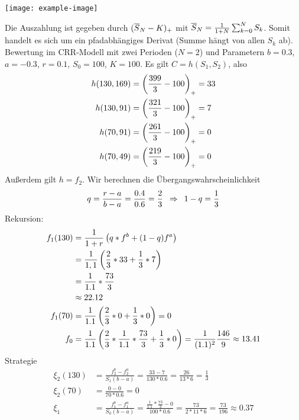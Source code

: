 \begin{*beispiel}
	\begin{center}
		\texttt{[image: example-image]}
	\end{center}

	Die Auszahlung ist gegeben durch $(\overline{S}_N - K)_+$ mit $\overline{S}_N = \frac{1}{1+N} \sum_{k=0}^{N} S_k$. Somit handelt es sich um ein pfadabhängiges Derivat (Summe hängt von allen $S_k$ ab). 
	Bewertung im CRR-Modell mit zwei Perioden ($N=2$) und Parametern $b = 0.3$, $a = -0.3$, $r=0.1$, $S_0 = 100$, $K=100$.
		Es gilt $C = h(S_1, S_2)$, also
	\begin{align*}
		h(130,169) &= \left( \frac{399}{3} - 100 \right)_+ = 33 \\
		h(130,91)  &= \left( \frac{321}{3} - 100 \right)_+ = 7 \\
		h(70, 91)  &= \left( \frac{261}{3} - 100 \right)_+ = 0 \\
		h(70, 49)  &= \left( \frac{219}{3} - 100 \right)_+ = 0 \\
	\end{align*} 
	Außerdem gilt $h = f_2$. Wir berechnen die Übergangswahrscheinlichkeit
	\begin{equation*}
		q = \frac{r-a}{b-a} = \frac{0.4}{0.6} = \frac{2}{3} \enskip \Rightarrow \enskip 1 - q = \frac{1}{3}
	\end{equation*}
	Rekursion:
	\begin{align*}
		f_1(130) &= \frac{1}{1+r} \left( q * f^b + (1-q) f^a \right) \\
		&= \frac{1}{1,1} \left( \frac{2}{3} * 33 + \frac{1}{3} * 7 \right) \\
		&= \frac{1}{1.1} * \frac{73}{3} \\
		&\approx 22.12 \\
		f_1(70) &= \frac{1}{1.1} \left( \frac{2}{3} * 0 + \frac{1}{3} * 0 \right) = 0 \\
		f_0 &= \frac{1}{1.1} \left( \frac{2}{3} * \frac{1}{1.1} * \frac{73}{3} + \frac{1}{3} * 0 \right) = \frac{1}{(1.1)^2} \frac{146}{9} \approx 13.41 
	\end{align*}
	Strategie
	\begin{align*}
		\xi_2(130) &= \frac{f_2^b - f_2^a}{S_1 (b-a)} = \frac{33 - 7}{130 * 0.6} = \frac{26}{13*6} = \frac{1}{3} \\
		\xi_2(70) &= \frac{0-0}{70 * 0.6} = 0 \\
		\xi_1 &= \frac{f_1^b - f_1^a}{S_0 (b-a)} = \frac{\frac{1}{1.1} * \frac{73}{3} - 0}{100 * 0.6} = \frac{73}{2*11*6} = \frac{73}{196} \approx 0.37
	\end{align*}
\end{*beispiel}


